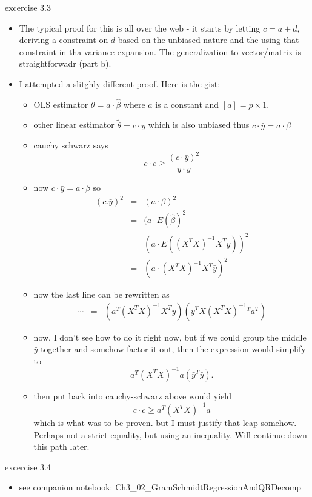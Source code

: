 \documentclass[a4paper]{report}
\newcommand{\<}{\textless}
\newcommand{\yb}{\bar{y}}
\renewcommand{\>}{\textgreater}
\begin{document}
excercise 3.3
\begin{itemize}
  \item The typical proof for this is all over the web - it starts by letting $c = a + d$, deriving a constraint on $d$ based on the unbiased nature and the using that constraint in tha variance expansion. The generalization to vector/matrix is straightforwadr (part b).
  \item I attempted a slitghly different proof. Here is the gist:
  \begin{itemize}
    \item OLS estimator $\theta = a \cdot \hat{\beta}$ where $a$ is a constant and $[a] = p\times 1$.
    \item other linear estimator $\tilde{\theta} = c \cdot y$ which is also unbiased
      \subitem thus $c \cdot \bar{y} = a \cdot \beta$
    \item cauchy schwarz says
      $$ c\cdot c \geq \frac{(c \cdot \bar{y})^2}{\bar{y}\cdot \bar{y}} $$
    \item now $c\cdot\bar{y} = a \cdot \beta$ so 
      \begin{eqnarray}
	(c.\bar{y})^2 &=& (a \cdot \beta)^2 \\
			&=& (a \cdot E(\hat{\beta})^2 \\
			  &=& (a \cdot E\left((X^TX)^{-1}X^Ty\right))^2 \\
			  &=& (a \cdot (X^TX)^{-1}X^T\yb)^2 
      \end{eqnarray}
    \item now the last line can be rewritten as
      \begin{eqnarray}
	\cdots &=& (a^T(X^TX)^{-1}X^T\yb)(\yb^TX(X^TX)^{-1}{}^Ta^T)
      \end{eqnarray}
    \item now, I don't see how to do it right now, but if we could group the middle $\yb$ together and somehow factor it out, then the expression would simplify to 
      $$a^T(X^TX)^{-1}a(\yb^T\yb).$$
    \item then put back into cauchy-schwarz above would yield
      $$c\cdot c \geq a^T(X^TX)^{-1}a$$
      which is what was to be proven. but I must justify that leap somehow. Perhaps not a strict equality, but using an inequality. Will continue down this path later.
  \end{itemize}
\end{itemize}

excercise 3.4
\begin{itemize}
  \item see companion notebook: Ch3\_02\_GramSchmidtRegressionAndQRDecomp
\end{itemize}
\end{document}
